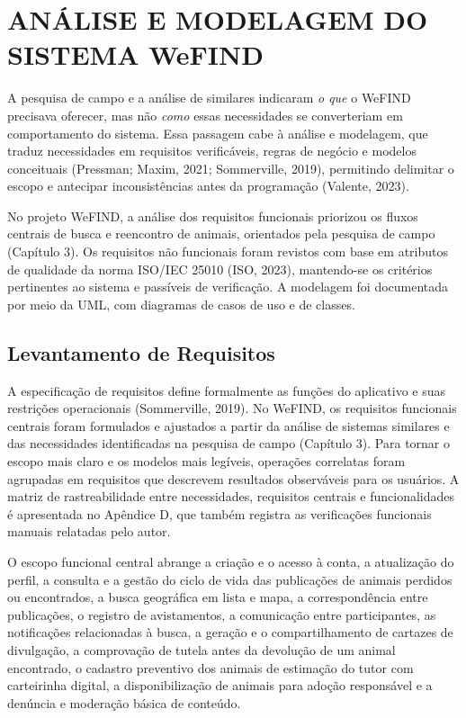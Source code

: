 \section{ANÁLISE E MODELAGEM DO SISTEMA WeFIND}

A pesquisa de campo e a análise de similares indicaram \textit{o que} o WeFIND precisava oferecer, mas não \textit{como} essas necessidades se converteriam em comportamento do sistema. Essa passagem cabe à análise e modelagem, que traduz necessidades em requisitos verificáveis, regras de negócio e modelos conceituais (Pressman; Maxim, 2021; Sommerville, 2019), permitindo delimitar o escopo e antecipar inconsistências antes da programação (Valente, 2023).

No projeto WeFIND, a análise dos requisitos funcionais priorizou os fluxos centrais de busca e reencontro de animais, orientados pela pesquisa de campo (Capítulo 3). Os requisitos não funcionais foram revistos com base em atributos de qualidade da norma ISO/IEC 25010 (ISO, 2023), mantendo-se os critérios pertinentes ao sistema e passíveis de verificação. A modelagem foi documentada por meio da UML, com diagramas de casos de uso e de classes.


\subsection{Levantamento de Requisitos}

A especificação de requisitos define formalmente as funções do aplicativo e suas restrições operacionais (Sommerville, 2019). No WeFIND, os requisitos funcionais centrais foram formulados e ajustados a partir da análise de sistemas similares e das necessidades identificadas na pesquisa de campo (Capítulo 3). Para tornar o escopo mais claro e os modelos mais legíveis, operações correlatas foram agrupadas em requisitos que descrevem resultados observáveis para os usuários. A matriz de rastreabilidade entre necessidades, requisitos centrais e funcionalidades é apresentada no Apêndice D, que também registra as verificações funcionais manuais relatadas pelo autor.

O escopo funcional central abrange a criação e o acesso à conta, a atualização do perfil, a consulta e a gestão do ciclo de vida das publicações de animais perdidos ou encontrados, a busca geográfica em lista e mapa, a correspondência entre publicações, o registro de avistamentos, a comunicação entre participantes, as notificações relacionadas à busca, a geração e o compartilhamento de cartazes de divulgação, a comprovação de tutela antes da devolução de um animal encontrado, o cadastro preventivo dos animais de estimação do tutor com carteirinha digital, a disponibilização de animais para adoção responsável e a denúncia e moderação básica de conteúdo.

